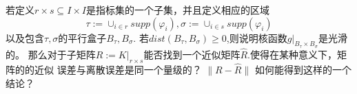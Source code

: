 若定义$r \times s \subseteq I \times I$是指标集的一个子集，并且定义相应的区域
\begin{equation}
	\tau := \cup_{i \in r} supp(\varphi_i), \sigma:=\cup_{i\in s}supp(\varphi_i)
\end{equation}
以及包含$\tau,\sigma$的平行盒子$B_{\tau},B_{\sigma}$.
若$dist(B_{\tau},B_{\sigma}) \ge 0$,则说明核函数$g|_{B_{\tau} \times B_{\sigma}}$是光滑的。
那么对于子矩阵$R:=K|_{r \times s}$能否找到一个近似矩阵$\hat{R}$.使得在某种意义下，矩阵的的近似
误差与离散误差是同一个量级的？
$\|R - \hat{R}\|$
如何能得到这样的一个结论？



\newpage
\putbib[20131020anarticle]
\newpage
	
